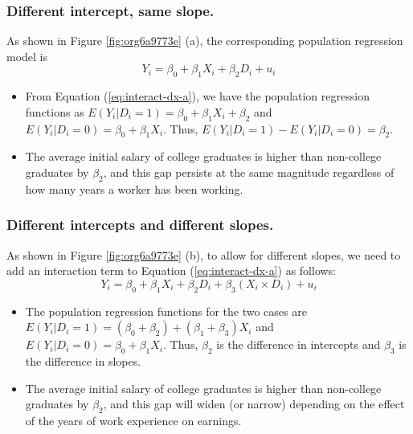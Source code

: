 \documentclass[a4paper,11pt]{article}
\begin{document}
\subsubsection*{Different intercept, same slope.}
\label{sec:orgfe4873f}
As shown in Figure \ref{fig:org6a9773e} (a), the corresponding population
regression model is
\begin{equation}
\label{eq:interact-dx-a}
Y_i = \beta_0 + \beta_1 X_i + \beta_2 D_i + u_i
\end{equation}

\begin{itemize}
\item From Equation (\ref{eq:interact-dx-a}), we have the population
regression functions as \(E(Y_i | D_i = 1) =
  \beta_0 + \beta_1 X_i + \beta_2\) and \(E(Y_i | D_i
  = 0) = \beta_0 + \beta_1 X_i\). Thus, \(E(Y_i | D_i = 1) - E(Y_i | D_i
  = 0) = \beta_2\).
\item The average initial salary of college graduates is higher than
non-college graduates by \(\beta_2\), and this gap persists at the same
magnitude regardless of how many years a worker has been working.
\end{itemize}

\subsubsection*{Different intercepts and different slopes.}
\label{sec:org360b9f7}
As shown in Figure \ref{fig:org6a9773e} (b), to allow for different slopes, we
need to add an interaction term to Equation (\ref{eq:interact-dx-a})
as follows:
\begin{equation}
\label{eq:interact-dx-b}
Y_i = \beta_0 + \beta_1 X_i + \beta_2 D_i + \beta_3 (X_i \times D_i) + u_i
\end{equation}

\begin{itemize}
\item The population regression functions for the two cases are
\(E(Y_i|D_i=1) = (\beta_0+\beta_2) + (\beta_1 + \beta_3) X_i\) and
\(E(Y_i|D_i=0) = \beta_0 + \beta_1 X_i\). Thus, \(\beta_2\) is the
difference in intercepts and \(\beta_3\) is the difference in slopes.
\item The average initial salary of college graduates is higher than
non-college graduates by \(\beta_2\), and this gap will widen (or
narrow) depending on the effect of the years of work experience on
earnings.
\end{itemize}
\end{document}
